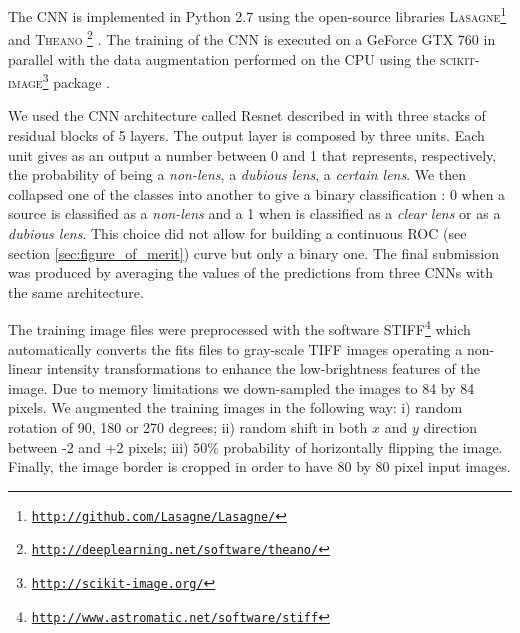 \documentclass{aa}
\begin{document}

The CNN is implemented in Python 2.7 using the open-source libraries \textsc{Lasagne}\footnote{\href{http://github.com/Lasagne/Lasagne/}{\tt http://github.com/Lasagne/Lasagne/}} 
and \textsc{Theano}
\footnote{\href{http://deeplearning.net/software/theano/}{\tt http://deeplearning.net/software/theano/}} \citep{theano}.  
The training of the CNN is executed on a GeForce GTX 760 in parallel with the data augmentation performed on the CPU using the \textsc{scikit-image}\footnote{\href{http://scikit-image.org/}{\tt http://scikit-image.org/}} package \citep{van2014scikit}. 

We used the CNN architecture called Resnet described in \citep{he2015deep} with three stacks of residual blocks of 5 layers. 
The output layer is composed by three units. Each unit gives as an output a number between 0 and 1 that represents, respectively, the probability of being a \textit{non-lens}, a \textit{dubious lens}, a \textit{certain lens}.  We then collapsed one of the classes into another to give a binary classification : 0 when a source is classified as a \textit{non-lens} and a 1 when is classified as a \textit{clear lens} or as a \textit{dubious lens}. This choice did not allow for building  a continuous ROC (see section \ref{sec:figure_of_merit})  curve but only a binary one.
The final submission was produced by averaging the values of the predictions from three CNNs with the same architecture.


The training image files were preprocessed with the software \textsc{STIFF}\footnote{\href{http://www.astromatic.net/software/stiff}{\tt http://www.astromatic.net/software/stiff}} which automatically converts the fits files to gray-scale TIFF images operating a non-linear intensity transformations to enhance the low-brightness features of the image.   
Due to memory limitations we down-sampled the images to 84 by 84 pixels. 
We augmented the training images in the following way: i) random rotation of 90, 180 or 270 degrees; ii) random shift in both $x$ and $y$ direction between -2 and +2 pixels; iii) $50\%$ probability of horizontally flipping the image. 
Finally, the image border is cropped in order to have 80 by 80 pixel input images.
\end{document}

